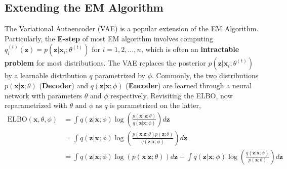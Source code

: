 \subsection{Extending the EM Algorithm}
The Variational Autoencoder (VAE) is a popular extension of the EM Algorithm. Particularly, the \textbf{E-step} of most EM algorithm involves computing $q_i^{(t)}(\mathbf{z})=p(\mathbf{z}|\mathbf{x}_i;\theta^{(t)})$ for $i=1,2,\dots,n$, which is often an \textbf{intractable problem} for most distributions. The VAE replaces the posterior $p(\mathbf{z}|\mathbf{x}_i;\theta^{(t)})$ by a learnable distribution $q$ parametrized by $\phi$. Commonly, the two distributions $p(\mathbf{x}|\mathbf{z};\theta)$ (\textbf{Decoder}) and $q(\mathbf{z}|\mathbf{x};\phi)$ (\textbf{Encoder}) are learned through a neural network with parameters $\theta$ and $\phi$ respectively. Revisiting the ELBO, now reparametrized with $\theta$ and $\phi$ as $q$ is parametrized on the latter,
\begin{align*}
    \text{ELBO}(\mathbf{x},\theta,\phi)
    &= \int q(\mathbf{z}|\mathbf{x};\phi) \log\left(\frac{p(\mathbf{x},\mathbf{z};\theta)}{q(\mathbf{z}|\mathbf{x};\phi)}\right) d\mathbf{z} \\
    &= \int q(\mathbf{z}|\mathbf{x};\phi) \log\left(\frac{p(\mathbf{x}|\mathbf{z};\theta)p(\mathbf{z};\theta)}{q(\mathbf{z}|\mathbf{x};\phi)}\right) d\mathbf{z} \\
    &= \int q(\mathbf{z}|\mathbf{x};\phi) \log(p(\mathbf{x}|\mathbf{z};\theta)) d\mathbf{z} - \int q(\mathbf{z}|\mathbf{x};\phi) \log\left(\frac{q(\mathbf{z}|\mathbf{x};\phi)}{p(\mathbf{z};\theta)}\right) d\mathbf{z}
\end{align*}
